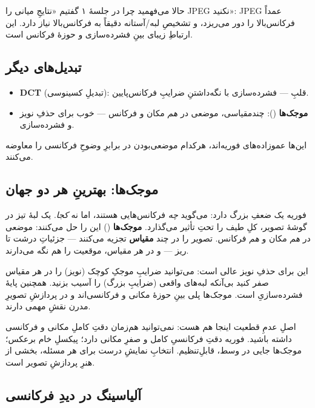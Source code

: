 \documentclass[12pt,a4paper]{article}
\begin{document}
\begin{yaddasht}
حالا می‌فهمید چرا در جلسهٔ ۱ گفتیم «نتایجِ میانی را JPEG نکنید»: JPEG عمداً فرکانس‌بالا را دور
می‌ریزد، و تشخیصِ لبه/آستانه دقیقاً به فرکانس‌بالا نیاز دارد. این ارتباطِ زیبای بینِ فشرده‌سازی و
حوزهٔ فرکانس است.
\end{yaddasht}

\subsection{تبدیل‌های دیگر}

\begin{itemize}
  \item \textbf{DCT} (تبدیلِ کسینوسی): قلبِ  — فشرده‌سازی با نگه‌داشتنِ ضرایبِ فرکانس‌پایین.
  \item \textbf{موجک‌ها} (): چندمقیاسی، موضعی در \emph{هم} مکان و فرکانس — خوب برای حذفِ نویز و فشرده‌سازی.
\end{itemize}

این‌ها عموزاده‌های فوریه‌اند، هرکدام موضعی‌بودن در برابرِ وضوحِ فرکانسی را معاوضه می‌کنند.

\subsection{موجک‌ها: بهترینِ هر دو جهان}

فوریه یک ضعفِ بزرگ دارد: می‌گوید \emph{چه} فرکانس‌هایی هستند، اما نه \emph{کجا}. یک لبهٔ تیز در
گوشهٔ تصویر، کلِ طیف را تحتِ تأثیر می‌گذارد. \textbf{موجک‌ها} () این را حل می‌کنند:
موضعی در \emph{هم} مکان و \emph{هم} فرکانس. تصویر را در چند \textbf{مقیاس} تجزیه می‌کنند — جزئیاتِ
درشت تا ریز — و در هر مقیاس، موقعیت را هم نگه می‌دارند.

این برای حذفِ نویز عالی است: می‌توانید ضرایبِ موجکِ کوچک (نویز) را در هر مقیاس صفر کنید بی‌آنکه
لبه‌های واقعی (ضرایبِ بزرگ) را آسیب بزنید. همچنین پایهٔ فشرده‌سازیِ  است. موجک‌ها
پلی بینِ حوزهٔ مکانی و فرکانسی‌اند و در پردازشِ تصویرِ مدرن نقشِ مهمی دارند.

\begin{yaddasht}
اصلِ عدمِ قطعیت اینجا هم هست: نمی‌توانید هم‌زمان دقتِ کاملِ مکانی و فرکانسی داشته باشید. فوریه دقتِ
فرکانسیِ کامل و صفرِ مکانی دارد؛ پیکسلِ خام برعکس؛ موجک‌ها جایی در وسط، قابلِ‌تنظیم. انتخابِ نمایشِ
درست برای هر مسئله، بخشی از هنرِ پردازشِ تصویر است.
\end{yaddasht}

\subsection{آلیاسینگ در دیدِ فرکانسی}
\end{document}
